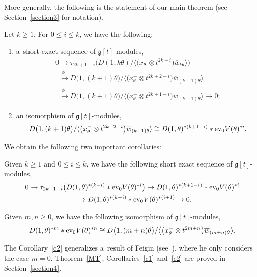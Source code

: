 \documentclass[pdftex]{sigma}
\numberwithin{equation}{section}
\begin{document}
More generally, the following is the statement of our main theorem (see Section~\ref{section3} for notation).
\begin{theorem}
\label{MT}
Let $k\geq 1$.
For $0\leq i \leq k$, we have the following:
\begin{enumerate}\itemsep=0pt
\item[$1)$] a~short exact sequence of $\mathfrak{g}[t]$-modules,
\begin{gather*}
0\rightarrow \tau_{2k+1-i} \big(D(1, k\theta)/\big\langle \big(x^{-}_\theta \otimes t^{2k-i}\big) \overline{w}_{k\theta}\big\rangle\big)
\\
\phantom{0}
\xrightarrow{\phi^{-}} D\big(1,(k+1)\theta\big)/\big\langle \big(x^{-}_\theta \otimes t^{2k+2-i}\big) \overline{w}_{(k+1)\theta}\big\rangle
\\
\phantom{0}
\xrightarrow{\phi^+} D\big(1,(k+1)\theta\big)/\big\langle \big(x^{-}_\theta \otimes t^{2k+1-i}\big) \overline{w}_{(k+1)\theta}\big\rangle \rightarrow 0;
\end{gather*}
\item[$2)$] an isomorphism of $\mathfrak{g}[t]$-modules,
\begin{gather*}
D\big(1,(k+1)\theta\big)/\langle \big(x^{-}_\theta \otimes t^{2k+2-i}\big) \overline{w}_{(k+1)\theta}\rangle \cong D(1,\theta)^{* (k+1-i)}* \textup{ev}_0 V(\theta)^{*i}.
\end{gather*}
\end{enumerate}
\end{theorem}

We obtain the following two important corollaries:
\begin{corollary}
\label{c1}
Given $k\geq 1$ and $0\leq i \leq k $, we have the following short exact sequence of $\mathfrak{g}[t]$-modules,
\begin{gather*}
0 \rightarrow \tau_{2k+1-i}\big(D(1,\theta)^{*(k-i)} * \textup{ev}_0 V(\theta)^{*i}\big) \rightarrow D(1,\theta)^{*(k+1-i)}*
\textup{ev}_0 V(\theta)^{*i}
\\
\phantom{0}
\rightarrow D(1,\theta)^{*(k-i)} * \textup{ev}_0 V(\theta)^{*(i+1)} \rightarrow 0.
\end{gather*}
\end{corollary}
\begin{corollary}
\label{c2}
Given $m,n\geq 0$, we have the following isomorphism of $\mathfrak{g}[t]$-modules,
\begin{gather*}
D(1,\theta)^{*m} * \textup{ev}_0 V(\theta)^{*n} \cong D\big(1,(m+n)\theta\big)/\big\langle \big(x^{-}_\theta \otimes t^{2m+n}\big)
\overline{w}_{(m+n)\theta}\big\rangle.
\end{gather*}
\end{corollary}
The Corollary~\ref{c2} generalizes a~result of Feigin (see~\cite[Corollary~2]{F}), where he only considers the case $m=0$.
Theorem~\ref{MT}, Corollaries~\ref{c1} and~\ref{c2} are proved in Section~\ref{section4}.
\end{document}
